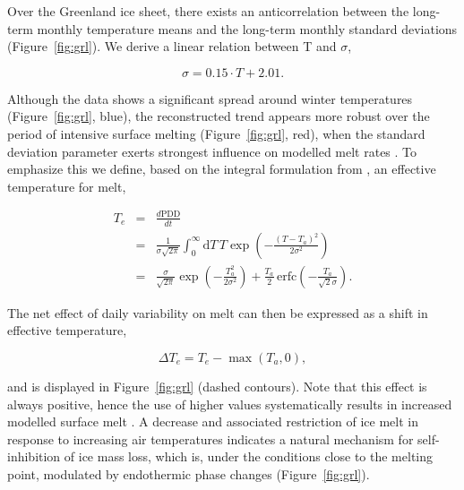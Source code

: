 \documentclass[review]{igs}
\begin{document}
Over the Greenland ice sheet, there exists an anticorrelation between the long-term monthly temperature means and the long-term monthly standard deviations (Figure~\ref{fig:grl}). We derive a linear relation between T and $\sigma$,

\begin{equation}
    \sigma = 0.15 \cdot T + 2.01.
\end{equation}

Although the data shows a significant spread around winter temperatures (Figure~\ref{fig:grl}, blue), the reconstructed trend appears more robust over the period of intensive surface melting (Figure~\ref{fig:grl}, red), when the standard deviation parameter exerts strongest influence on modelled melt rates \citep{rogozhina-rau-inpress}. To emphasize this we define, based on the integral formulation from \citep{calov-greve-2005}, an effective temperature for melt,

\begin{eqnarray} \label{eq:calovgreve}
    T_e &=& \frac{d\mathrm{PDD}}{dt}\\
        &=& \frac{1}{\sigma\sqrt{2\pi}}
            \int_{0}^{\infty} \mathrm{d}T \, T \exp\left({-\frac{(T-T_a)^2}{2\sigma^2}}\right)\\
        &=& \frac{\sigma}{\sqrt{2\pi}} \exp\left({-\frac{T_a^2}{2\sigma^2}}\right)
            + \frac{T_a}{2} \, \mathrm{erfc} \left(-\frac{T_a}{\sqrt{2}\sigma}\right).
\end{eqnarray}

The net effect of daily variability on melt can then be expressed as a shift in effective temperature,

\begin{equation}
    \Delta T_e = T_e - \max(T_a, 0),
\end{equation}

and is displayed in Figure~\ref{fig:grl} (dashed contours). Note that this effect is always positive, hence the use of higher values systematically results in increased modelled surface melt \citep{rogozhina-rau-inpress}. A decrease and associated restriction of ice melt in response to increasing air temperatures indicates a natural mechanism for self-inhibition of ice mass loss, which is, under the conditions close to the melting point, modulated by endothermic phase changes (Figure~\ref{fig:grl}).
\end{document}
